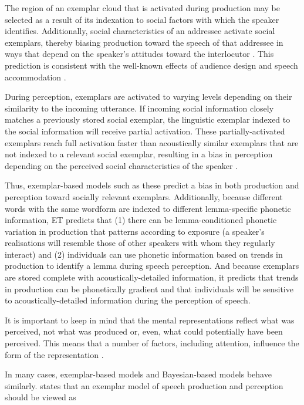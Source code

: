 The region of an exemplar cloud that is activated during production may be selected as a result of its indexation to social factors with which the speaker identifies.  Additionally, social characteristics of an addressee activate social exemplars, thereby biasing production toward the speech of that addressee in ways that depend on the speaker's attitudes toward the interlocutor \cite{drageretal2010,babel2012}.  This prediction is consistent with the well-known effects of audience design and speech accommodation \cite{bell1984,gilesetal1991,oprah1999}.

During perception, exemplars are activated to varying levels depending on their similarity to the incoming utterance.  If incoming social information closely matches a previously stored social exemplar, the linguistic exemplar indexed to the social information will receive partial activation.  These partially-activated exemplars reach full activation faster than acoustically similar exemplars that are not indexed to a relevant social exemplar, resulting in a bias in perception depending on the perceived social characteristics of the speaker \cite{strandjohnson1996,niedzielski1999,haywarrendrager2006}.   
 
Thus, exemplar-based models such as these predict a bias in both production and perception toward socially relevant exemplars. Additionally, because different words with the same wordform are indexed to different lemma-specific phonetic information, ET predicts that (1) there can be lemma-conditioned phonetic variation in production that patterns according to exposure (a speaker's realisations will resemble those of other speakers with whom they regularly interact) and (2) individuals can use phonetic information based on trends in production to identify a lemma during speech perception.  And because exemplars are stored complete with acoustically-detailed information, it predicts that trends in production can be phonetically gradient and that individuals will be sensitive to acoustically-detailed information during the perception of speech.

It is important to keep in mind that the mental representations reflect what was perceived, not what was produced or, even, what could potentially have been perceived.  This means that a number of factors, including attention, influence the form of the representation \cite{foulkeshay2015}.  

In many cases, exemplar-based models and Bayesian-based models behave similarly.	  states that an exemplar model of speech production and perception should be viewed as

